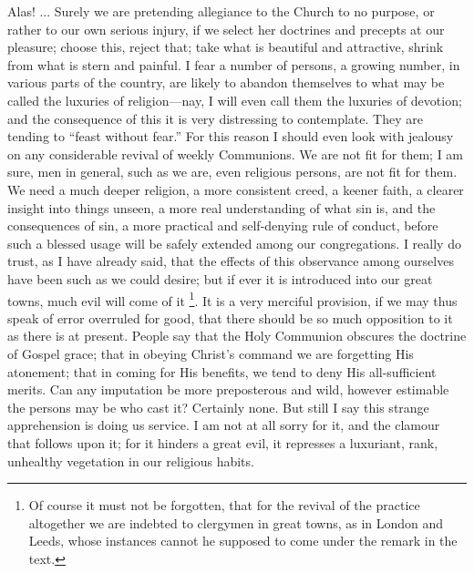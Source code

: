 Alas! ... Surely we are pretending allegiance to the Church to no
purpose, or rather to our own serious injury, if we select her
doctrines and precepts at our pleasure; choose this, reject that; take
what is beautiful and attractive, shrink from what is stern and
painful. I fear a number of persons, a growing number, in various
parts of the country, are likely to abandon themselves to what may be
called the luxuries of religion—nay, I will even call them the
luxuries of devotion; and the consequence of this it is very
distressing to contemplate. They are tending to ``feast without
fear.'' For this reason I should even look with jealousy on any
considerable revival of weekly Communions. We are not fit for them; I
am sure, men in general, such as we are, even religious persons, are
not fit for them. We need a much deeper religion, a more consistent
creed, a keener faith, a clearer insight into things unseen, a more
real understanding of what sin is, and the consequences of sin, a more
practical and self-denying rule of conduct, before such a blessed
usage will be safely extended among our congregations. I really do
trust, as I have already said, that the effects of this observance
among ourselves have been such as we could desire; but if ever it is
introduced into our great towns, much evil will come of it \footnote{Of course it must not be forgotten, that for
the revival of the practice altogether we are indebted to clergymen in
great towns, as in London and Leeds, whose instances cannot he
supposed to come under the remark in the text.}. It is a very merciful provision, if we may thus speak of
error overruled for good, that there should be so much opposition to
it as there is at present. People say that the Holy Communion obscures
the doctrine of Gospel grace; that in obeying Christ's command we are
forgetting His atonement; that in coming for His benefits, we tend to
deny His all-sufficient merits. Can any imputation be more
preposterous and wild, however estimable the persons may be who cast
it? Certainly none. But still I say this strange apprehension is doing
us service. I am not at all sorry for it, and the clamour that follows
upon it; for it hinders a great evil, it represses a luxuriant, rank,
unhealthy vegetation in our religious habits.


